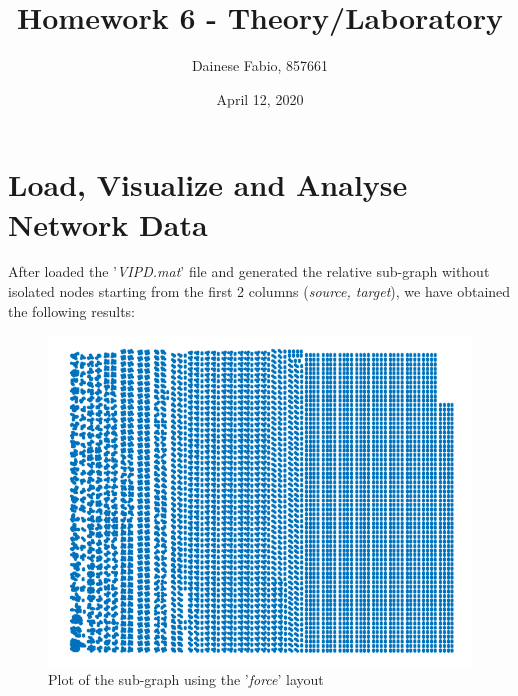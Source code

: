 \documentclass{article}
\title{Homework 6 - Theory/Laboratory}
\author{Dainese Fabio, 857661}
\date{April 12, 2020}
\begin{document}
\maketitle

\section{Load, Visualize and Analyse Network Data}
    After loaded the '\textit{VIPD.mat}' file and generated the relative sub-graph without isolated nodes starting from the first 2 columns (\textit{source, target}), we have obtained the following results:
    
    \begin{figure}[H]
            \centering
            \includegraphics[width=\textwidth]{1.png}
            \caption{Plot of the sub-graph using the '\textit{force}' layout}
            \label{fig:figure-1}
    \end{figure}
    
\end{document}
